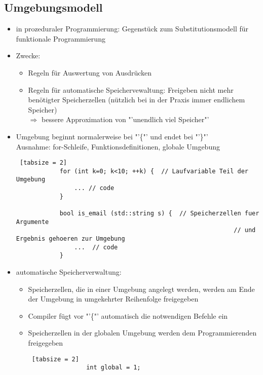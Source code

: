\documentclass{article}
\begin{document}
	
	\subsection{Umgebungsmodell}
	\begin{itemize}
		\item in prozeduraler Programmierung: Gegenstück zum Substitutionsmodell für funktionale Programmierung
		\item Zwecke:
		\begin{itemize}
			\item Regeln für Auswertung von Ausdrücken
			\item Regeln für automatische Speichervewaltung: Freigeben nicht mehr benötigter Speicherzellen (nützlich bei in der Praxis immer endlichem Speicher) \\
			$\Rightarrow$ bessere Approximation von "'unendlich viel Speicher"'
		\end{itemize}
		\item Umgebung beginnt normalerweise bei "'\{"' und endet bei "'\}"' \\
		Ausnahme: for-Schleife, Funktionsdefinitionen, globale Umgebung
		
		\begin{lstlisting} [tabsize = 2]
			for (int k=0; k<10; ++k) {  // Laufvariable Teil der Umgebung
				... // code 
			}
			
			bool is_email (std::string s) {  // Speicherzellen fuer Argumente 
														   	// und Ergebnis gehoeren zur Umgebung
				...  // code
			}
		\end{lstlisting}
		
		\item automatische Speicherverwaltung:
		\begin{itemize}
			\item Speicherzellen, die in einer Umgebung angelegt werden, werden am Ende der Umgebung in umgekehrter Reihenfolge freigegeben
			\item Compiler fügt vor "'\{"' automatisch die notwendigen Befehle ein
			\item Speicherzellen in der globalen Umgebung werden dem Programmierenden freigegeben
			
			\begin{lstlisting} [tabsize = 2]
				int global = 1;
				

\end{lstlisting}
\end{itemize}
\end{itemize}
\end{document}

